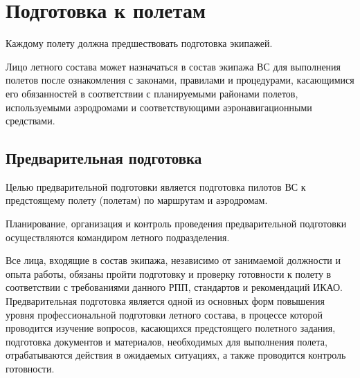 
\section{Подготовка к полетам}

Каждому полету должна предшествовать подготовка экипажей. 

Лицо летного состава может назначаться в состав экипажа ВС для выполнения полетов после ознакомления с законами, правилами и процедурами, касающимися его обязанностей в соответствии с планируемыми районами полетов, используемыми аэродромами и соответствующими аэронавигационными средствами.

\subsection{Предварительная подготовка}


Целью предварительной подготовки является подготовка пилотов ВС к предстоящему полету (полетам) по маршрутам и аэродромам. 

Планирование, организация и контроль проведения предварительной подготовки осуществляются командиром летного подразделения.

Все лица, входящие в состав экипажа, независимо от занимаемой должности и опыта работы, обязаны пройти подготовку и проверку готовности к полету в соответствии с требованиями данного РПП, стандартов и рекомендаций ИКАО.
Предварительная подготовка является одной из основных форм повышения уровня профессиональной подготовки летного состава, в процессе которой проводится изучение вопросов, касающихся предстоящего полетного задания, подготовка документов и материалов, необходимых для выполнения полета, отрабатываются действия в ожидаемых ситуациях, а также проводится контроль готовности.

